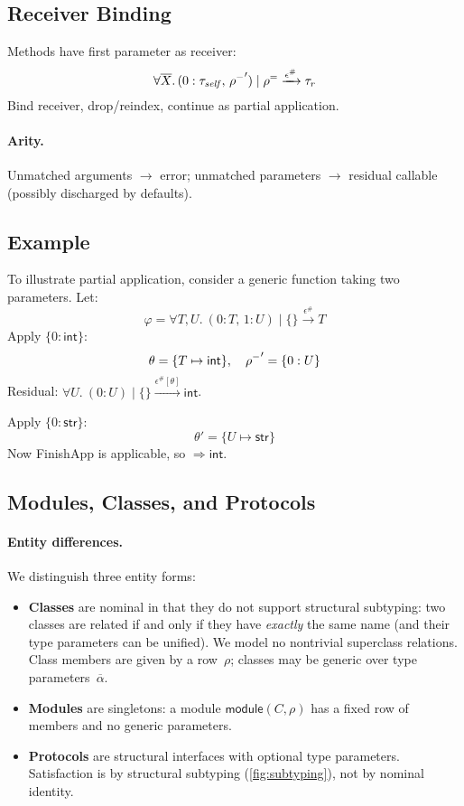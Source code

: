 \subsection{Receiver Binding}
\label{sec:receiver-binding}
Methods have first parameter as receiver:
\[
\forall \overline{X}.\,(0:\tau_{\mathit{self}},\,\mathord{\rho^{-}}') \mid \mathord{\rho^{=}} \xrightarrow{\epsilon^\#} \tau_r
\]
Bind receiver, drop/reindex, continue as partial application.

\paragraph{Arity.}
Unmatched arguments $\to$ error; unmatched parameters $\to$ residual callable (possibly discharged by defaults).

\subsection{Example}
To illustrate partial application, consider a generic function taking two parameters. Let:
\[
\varphi = \forall T,U.~(0:T,\,1:U) \mid \{\} \xrightarrow{\epsilon^\#} T
\]
Apply $\{0:\mathsf{int}\}$:
\[
\theta=\{T\mapsto \mathsf{int}\},\quad \mathord{\rho^{-}}'=\{0:U\}
\]
Residual: $\forall U.~(0:U) \mid \{\} \xrightarrow{\epsilon^\#[\theta]} \mathsf{int}$.

Apply $\{0:\mathsf{str}\}$:
\[
\theta'=\{U\mapsto \mathsf{str}\}
\]
Now \textsf{FinishApp} is applicable, so $\Rightarrow \mathsf{int}$.

\subsection{Modules, Classes, and Protocols}
\label{sec:modules-classes-protocols}

\paragraph{Entity differences.}
We distinguish three entity forms:
\begin{itemize}
    \item \textbf{Classes} are nominal in that they do not support structural subtyping: two classes are related if and only if they have \emph{exactly} the same name (and their type parameters can be unified). We model no nontrivial superclass relations. Class members are given by a row~$\rho$; classes may be generic over type parameters~$\overline{\alpha}$.
    \item \textbf{Modules} are singletons: a module $\mathsf{module}(C, \rho)$ has a fixed row of members and no generic parameters.
    \item \textbf{Protocols} are structural interfaces with optional type parameters. Satisfaction is by structural subtyping (\autoref{fig:subtyping}), not by nominal identity.
\end{itemize}

